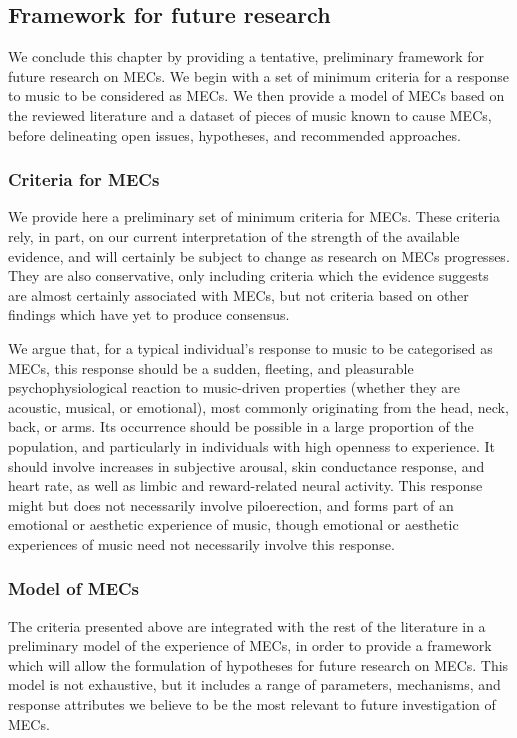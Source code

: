 \subsection{Framework for future research}
\label{se:rev-discussion-4}

We conclude this chapter by providing a tentative, preliminary framework for future research on MECs. We begin with a set of minimum criteria for a response to music to be considered as MECs. We then provide a model of MECs based on the reviewed literature and a dataset of pieces of music known to cause MECs, before delineating open issues, hypotheses, and recommended approaches.

\subsubsection{Criteria for MECs}

We provide here a preliminary set of minimum criteria for MECs. These criteria rely, in part, on our current interpretation of the strength of the available evidence, and will certainly be subject to change as research on MECs progresses. They are also conservative, only including criteria which the evidence suggests are almost certainly associated with MECs, but not criteria based on other findings which have yet to produce consensus.

We argue that, for a typical individual’s response to music to be categorised as MECs, this response should be a sudden, fleeting, and pleasurable psychophysiological reaction to music-driven properties (whether they are acoustic, musical, or emotional), most commonly originating from the head, neck, back, or arms. Its occurrence should be possible in a large proportion of the population, and particularly in individuals with high openness to experience. It should involve increases in subjective arousal, skin conductance response, and heart rate, as well as limbic and reward-related neural activity. This response might but does not necessarily involve piloerection, and forms part of an emotional or aesthetic experience of music, though emotional or aesthetic experiences of music need not necessarily involve this response.

\subsubsection{Model of MECs}

The criteria presented above are integrated with the rest of the literature in a preliminary model of the experience of MECs, in order to provide a framework which will allow the formulation of hypotheses for future research on MECs. This model is not exhaustive, but it includes a range of parameters, mechanisms, and response attributes we believe to be the most relevant to future investigation of MECs.

